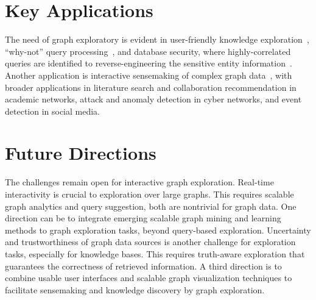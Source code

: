 \documentclass[graybox, natbib, nosecnum, twocolumn]{svmult}
\begin{document}
 



\section{Key Applications}

The need of graph exploratory is evident in user-friendly 
knowledge exploration~\citep{achiezra2010exploratory},  
 ``why-not'' query processing~\citep{tran2010conquer}, and database security, where highly-correlated 
queries are identified to reverse-engineering 
the sensitive entity information~\citep{tran2014query}.
Another application is interactive sensemaking of complex graph data~\citep{pienta2015scalable}, with broader applications in 
literature search and collaboration recommendation 
in academic networks, attack and anomaly detection  
in cyber networks, and event detection in social media. 

\section{Future Directions} 

The challenges remain open for interactive graph 
exploration. Real-time interactivity is 
crucial to exploration over large graphs. 
This requires scalable graph analytics and 
query suggestion, both are nontrivial for 
graph data. One direction can be to 
integrate emerging scalable graph mining 
and learning methods
to graph exploration tasks, beyond query-based 
exploration. Uncertainty and trustworthiness of 
graph data sources is another challenge 
for exploration tasks, especially for 
knowledge bases. This requires 
truth-aware exploration that guarantees 
the correctness of retrieved information. 
A third direction is to combine 
usable user interfaces and 
scalable graph visualization 
techniques to facilitate 
sensemaking and knowledge discovery 
by graph exploration.  




\end{document}
